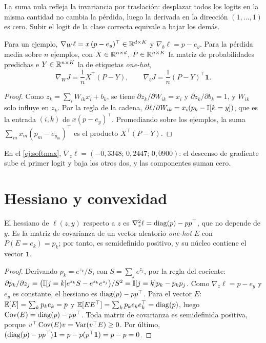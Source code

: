 La suma nula refleja la invariancia por traslación: desplazar todos los logits en la misma cantidad no cambia la pérdida, luego la derivada en la dirección $(1,\dots,1)$ es cero. Subir el logit de la clase correcta equivale a bajar los demás.

\begin{corolario}\label{cor:grad-W}
Para un ejemplo, $\nabla_W\ell=x\,(p-e_y)^{\top}\in\mathbb{R}^{d\times K}$ y $\nabla_b\ell=p-e_y$. Para la pérdida media sobre $n$ ejemplos, con $X\in\mathbb{R}^{n\times d}$, $P\in\mathbb{R}^{n\times K}$ la matriz de probabilidades predichas e $Y\in\mathbb{R}^{n\times K}$ la de etiquetas \emph{one-hot},
\[
\nabla_W J=\frac{1}{n}X^{\top}(P-Y),\qquad \nabla_bJ=\frac1n(P-Y)^{\top}\mathbf{1}.
\]
\end{corolario}

\begin{proof}
Como $z_k=\sum_iW_{ik}x_i+b_k$, se tiene $\partial z_k/\partial W_{ik}=x_i$ y $\partial z_k/\partial b_k=1$, y $W_{ik}$ solo influye en $z_k$. Por la regla de la cadena, $\partial\ell/\partial W_{ik}=x_i(p_k-\mathbb{I}[k=y])$, que es la entrada $(i,k)$ de $x(p-e_y)^{\top}$. Promediando sobre los ejemplos, la suma $\sum_m x_m(p_m-e_{y_m})^{\top}$ es el producto $X^{\top}(P-Y)$.
\end{proof}

En el \cref{ej:softmax}, $\nabla_z\ell=(-0{,}3348;\,0{,}2447;\,0{,}0900)$: el descenso de gradiente sube el primer logit y baja los otros dos, y las componentes suman cero.

\section{Hessiano y convexidad}

\begin{proposicion}\label{prop:hess-softmax}
El hessiano de $\ell(z,y)$ respecto a $z$ es $\nabla_z^{2}\ell=\operatorname{diag}(p)-pp^{\top}$, que no depende de $y$. Es la matriz de covarianza de un vector aleatorio \emph{one-hot} $E$ con $P(E=e_k)=p_k$; por tanto, es semidefinido positivo, y su núcleo contiene el vector $\mathbf{1}$.
\end{proposicion}

\begin{proof}
Derivando $p_k=e^{z_k}/S$, con $S=\sum_je^{z_j}$, por la regla del cociente: $\partial p_k/\partial z_j=\bigl(\mathbb{I}[j=k]e^{z_k}S-e^{z_k}e^{z_j}\bigr)/S^{2}=\mathbb{I}[j=k]p_k-p_kp_j$. Como $\nabla_z\ell=p-e_y$ y $e_y$ es constante, el hessiano es $\operatorname{diag}(p)-pp^{\top}$. Para el vector $E$: $\mathbb{E}[E]=\sum_kp_ke_k=p$ y $\mathbb{E}[EE^{\top}]=\sum_kp_ke_ke_k^{\top}=\operatorname{diag}(p)$, luego $\operatorname{Cov}(E)=\operatorname{diag}(p)-pp^{\top}$. Toda matriz de covarianza es semidefinida positiva, porque $v^{\top}\operatorname{Cov}(E)v=\operatorname{Var}(v^{\top}E)\ge 0$. Por último, $(\operatorname{diag}(p)-pp^{\top})\mathbf{1}=p-p(p^{\top}\mathbf{1})=p-p=0$.
\end{proof}

